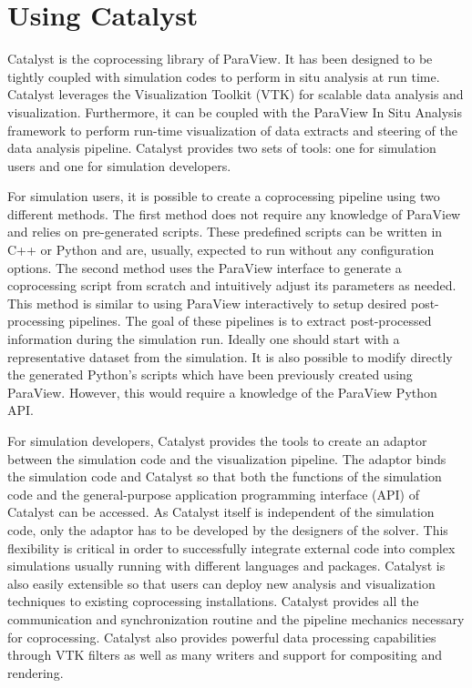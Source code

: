 \section{Using Catalyst}
\label{sec:catalyst}

Catalyst is the coprocessing library of ParaView. 
It has been designed to be tightly coupled with simulation codes to perform in situ analysis at run time. 
Catalyst leverages the Visualization Toolkit (VTK) for scalable data analysis and visualization. Furthermore, it can be coupled with the ParaView In Situ Analysis framework to perform run-time visualization of data extracts and steering of the data analysis pipeline.
Catalyst provides two sets of tools: one for simulation users and one for simulation developers.

For simulation users, it is possible to create a coprocessing pipeline using two different methods. 
The first method does not require any knowledge of ParaView and relies on pre-generated scripts. These predefined scripts can be written in C++ or Python and are, usually, expected to run without any configuration options. 
The second method uses the ParaView interface to generate a coprocessing script from scratch and intuitively adjust its parameters as needed. This method is similar to using ParaView interactively to setup desired post-processing pipelines. The goal of these pipelines is to extract post-processed information during the simulation run. Ideally one should start with a representative dataset from the simulation. It is also possible to modify directly the generated Python's scripts which have been previously created using ParaView. However, this would require a knowledge of the ParaView Python API.

For simulation developers, Catalyst provides the tools to create an adaptor between the simulation code and the visualization pipeline.
The adaptor binds the simulation code and Catalyst so that both the functions of the simulation code and the general-purpose application programming interface (API) of Catalyst can be accessed. As Catalyst itself is independent of the simulation code, only the adaptor has to be developed by the designers of the solver. This flexibility is critical in order to successfully integrate external code into complex simulations usually running with different languages and packages. Catalyst is also easily extensible so that users can deploy new analysis and visualization techniques to existing coprocessing installations. Catalyst provides all the communication and synchronization routine and the pipeline mechanics necessary for coprocessing. Catalyst also provides powerful data processing capabilities through VTK filters as well as many writers and support for compositing and rendering.

